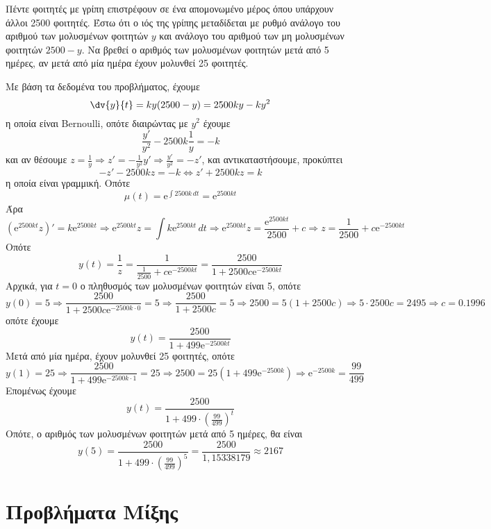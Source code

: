 \begin{problem}
  Πέντε φοιτητές με γρίπη επιστρέφουν σε ένα απομονωμένο μέρος όπου υπάρχουν άλλοι 
  2500 φοιτητές. Έστω ότι ο ιός της γρίπης μεταδίδεται με ρυθμό ανάλογο του αριθμού των 
  μολυσμένων φοιτητών $y$ και ανάλογο του αριθμού των μη μολυσμένων φοιτητών $ 2500-y $.
  Να βρεθεί ο αριθμός των μολυσμένων φοιτητών μετά από 5 ημέρες, αν μετά από μία 
  ημέρα έχουν μολυνθεί 25 φοιτητές.
\end{problem}
\begin{solution}
  Με βάση τα δεδομένα του προβλήματος, έχουμε 
  \[
    \dv{y}{t} = ky(2500-y) = 2500ky - ky^{2}
  \] 
  η οποία είναι Bernoulli, οπότε διαιρώντας με $ y^{2} $ έχουμε
  \[
    \frac{y'}{y^{2}} -2500k \frac{1}{y} = -k
  \] 
  και αν θέσουμε $ z = \frac{1}{y} \Rightarrow z' = - \frac{1}{y^{2}}y' \Rightarrow
  \frac{y'}{y^{2}} = -z' $, και αντικαταστήσουμε, προκύπτει
  \[
    -z'-2500kz=-k \Leftrightarrow z' + 2500kz = k
  \]
  η οποία είναι γραμμική. Οπότε
  \[
    \mu (t) = \mathrm{e}^{\int 2500k \,{dt}} = \mathrm{e}^{2500kt} 
  \] 
  Άρα 
  \[
    \left(\mathrm{e}^{2500kt} z\right)' = k \mathrm{e}^{2500kt} \Rightarrow 
    \mathrm{e}^{2500kt} z = \int k \mathrm{e}^{2500kt} \,{dt} \Rightarrow 
    \mathrm{e}^{2500kt} z = \frac{\mathrm{e}^{2500kt}}{2500} + c \Rightarrow 
    z = \frac{1}{2500} + c \mathrm{e}^{-2500kt}
  \] 
  Οπότε
  \[
    y(t) = \frac{1}{z} = \frac{1}{\frac{1}{2500} + c \mathrm{e}^{-2500kt}} =
    \frac{2500}{1 + 2500c \mathrm{e}^{-2500kt}} 
  \]
  Αρχικά, για $ t=0 $ ο πληθυσμός των μολυσμένων φοιτητών είναι 5, οπότε
  \[
    y(0)= 5 \Rightarrow  \frac{2500}{1 + 2500c \mathrm{e}^{-2500k\cdot 0}} = 
    5 \Rightarrow \frac{2500}{1 + 2500c} = 5 \Rightarrow 2500 = 5(1+2500c) 
    \Rightarrow 5\cdot 2500 c = 2495 \Rightarrow c = 0.1996
  \] 
  οπότε έχουμε
  \[
    y(t) = \frac{2500}{1 + 499 \mathrm{e}^{-2500kt}} 
  \] 
  Μετά από μία ημέρα, έχουν μολυνθεί 25 φοιτητές, οπότε
  \[
    y(1)=25 \Rightarrow \frac{2500}{1 + 499\mathrm{e}^{-2500k \cdot 1}} = 25
    \Rightarrow 2500 = 25 \left(1+ 499\mathrm{e}^{-2500k}\right) 
    \Rightarrow \mathrm{e}^{-2500k} = \frac{99}{499} 
  \] 
  Επομένως έχουμε
  \[
    y(t) = \frac{2500}{1+ 499\cdot \left(\frac{99}{499}\right)^{t}}
  \] 
  Οπότε, ο αριθμός των μολυσμένων φοιτητών μετά από 5 ημέρες, θα είναι
  \[
    y(5) = \frac{2500}{1+ 499\cdot \left(\frac{99}{499}\right)^{5}} =
    \frac{2500}{1,15338179} \approx 2167 
  \] 
\end{solution}

\section*{Προβλήματα Μίξης}

